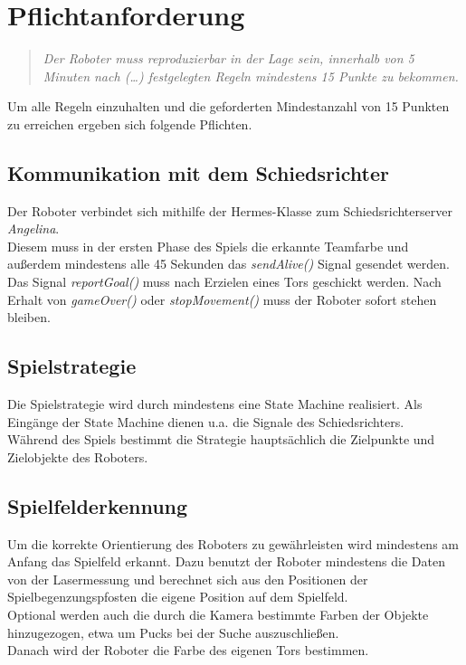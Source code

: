 \documentclass[12pt]{article}
\begin{document}
\section{Pflichtanforderung}
\begin{quote}
	\textit{Der Roboter muss reproduzierbar in der Lage sein, innerhalb von 5 Minuten nach (\ldots) festgelegten Regeln mindestens 15 Punkte zu bekommen.}
\end{quote}

Um alle Regeln einzuhalten und die geforderten Mindestanzahl von 15 Punkten zu erreichen ergeben sich folgende Pflichten.

\subsection{Kommunikation mit dem Schiedsrichter}
Der Roboter verbindet sich mithilfe der Hermes-Klasse zum Schiedsrichterserver \textit{Angelina}. \\
Diesem muss in der ersten Phase des Spiels die erkannte Teamfarbe und außerdem mindestens alle 45 Sekunden das \textit{sendAlive()} Signal gesendet werden. Das Signal \textit{reportGoal()} muss nach Erzielen eines Tors geschickt werden. Nach Erhalt von \textit{gameOver()} oder \textit{stopMovement()} muss der Roboter sofort stehen bleiben.

\subsection{Spielstrategie}
Die Spielstrategie wird durch mindestens eine State Machine realisiert. Als Eingänge der State Machine dienen u.a. die Signale des Schiedsrichters.\\
Während des Spiels bestimmt die Strategie hauptsächlich die Zielpunkte und Ziel\-objekte des Roboters.

\subsection{Spielfelderkennung}
Um die korrekte Orientierung des Roboters zu gewährleisten wird mindestens am Anfang das Spielfeld erkannt. Dazu benutzt der Roboter mindestens die Daten von der Lasermessung und berechnet sich aus den Positionen der Spielbegenzungspfosten die eigene Position auf dem Spielfeld.\\
Optional werden auch die durch die Kamera bestimmte Farben der Objekte hinzugezogen, etwa um Pucks bei der Suche auszuschließen.\\
Danach wird der Roboter die Farbe des eigenen Tors bestimmen.
\end{document}
